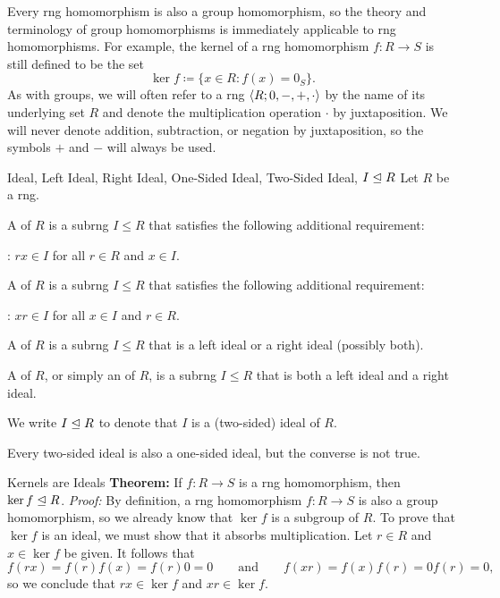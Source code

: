 Every rng homomorphism is also a group homomorphism, so the theory and terminology of group homomorphisms is immediately applicable to rng homomorphisms. For example, the kernel of a rng homomorphism $f: R \to S$ is still defined to be the set
\[ \ker f \coloneq \{ x \in R : f(x) = 0_S \}. \]
As with groups, we will often refer to a rng ${\langle {R; 0, -, +, \cdot} \rangle}$ by the name of its underlying set $R$ and denote the multiplication operation $\cdot$ by juxtaposition. We will never denote addition, subtraction, or negation by juxtaposition, so the symbols $+$ and $-$ will always be used.

\begin{dfnbox}{Ideal, Left Ideal, Right Ideal, One-Sided Ideal, Two-Sided Ideal, $I \trianglelefteq R$}
	Let $R$ be a rng.
	\begin{dfnitems}
		\item A  of $R$ is a subrng $I \le R$ that satisfies the following additional requirement:
		\begin{dfnitems}
			\item {}: $rx \in I$ for all $r \in R$ and $x \in I$.
		\end{dfnitems}
		\item A  of $R$ is a subrng $I \le R$ that satisfies the following additional requirement:
		\begin{dfnitems}
			\item {}: $xr \in I$ for all $x \in I$ and $r \in R$.
		\end{dfnitems}
		\item A  of $R$ is a subrng $I \le R$ that is a left ideal or a right ideal (possibly both).
		\item A  of $R$, or simply an  of $R$, is a subrng $I \le R$ that is both a left ideal and a right ideal.
	\end{dfnitems}
	We write $I \trianglelefteq R$ to denote that $I$ is a (two-sided) ideal of $R$.
\end{dfnbox}

Every two-sided ideal is also a one-sided ideal, but the converse is not true.

\begin{thmbox}{Kernels are Ideals}
	\textbf{Theorem:} If $f: R \to S$ is a rng homomorphism, then $\ker f \trianglelefteq R$.
\tcblower
	\textit{Proof:} By definition, a rng homomorphism $f: R \to S$ is also a group homomorphism, so we already know that $\ker f$ is a subgroup of $R$. To prove that $\ker f$ is an ideal, we must show that it absorbs multiplication. Let $r \in R$ and $x \in \ker f$ be given. It follows that
	\[ f(rx) = f(r)f(x) = f(r)0 = 0
	\qquad \text{and} \qquad
	f(xr) = f(x)f(r) = 0f(r) = 0, \]
	so we conclude that $rx \in \ker f$ and $xr \in \ker f$.
\end{thmbox}

